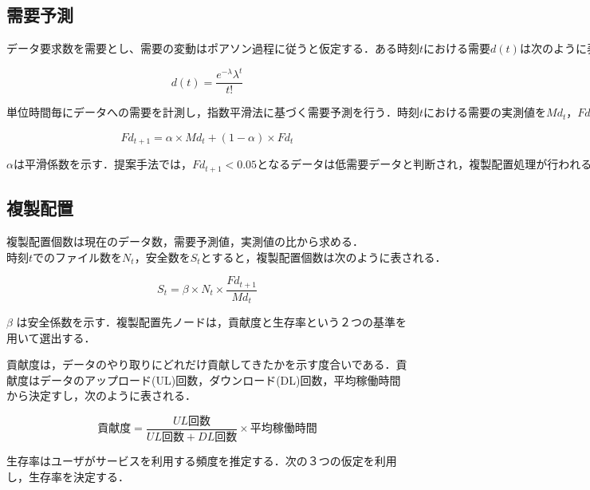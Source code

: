 \documentclass[11pt]{jreport}
\begin{document}
\subsection{需要予測}
$データ要求数を需要とし、需要の変動はポアソン過程に従うと仮定する．ある時刻tにおける需要d(t)は次のように表される．\lambda は単位時間中の平均のデータ要求数を示す．$

\[
d(t)=\frac{e^{-\lambda}\lambda^t}{t!}
\]

\par $単位時間毎にデータへの需要を計測し，指数平滑法に基づく需要予測を行う．時刻tにおける需要の実測値をMd_t，Fd_tと表す．この時，需要予測値Fd_{t+1}は次のように表される．$

\[
Fd_{t+1}=\alpha \times Md_t+(1-\alpha) \times Fd_t
\]

\par $\alpha は平滑係数を示す．提案手法では，Fd_{t+1}<0.05となるデータは低需要データと判断され，複製配置処理が行われる．$

\subsection{複製配置}
複製配置個数は現在のデータ数，需要予測値，実測値の比から求める．$時刻tでのファイル数をN_t，安全数をS_tとすると，複製配置個数は次のように表される．$

\[
S_t=\beta \times N_t \times \frac{Fd_{t+1}}{Md_t}
\]

\par $\beta$ は安全係数を示す．複製配置先ノードは，貢献度と生存率という２つの基準を用いて選出する．
\par 貢献度は，データのやり取りにどれだけ貢献してきたかを示す度合いである．貢献度はデータのアップロード(UL)回数，ダウンロード(DL)回数，平均稼働時間から決定すし，次のように表される．

\[
貢献度=\frac{UL回数}{UL回数+DL回数} \times 平均稼働時間
\]

\par 生存率はユーザがサービスを利用する頻度を推定する．次の３つの仮定を利用し，生存率を決定する．
\end{document}
